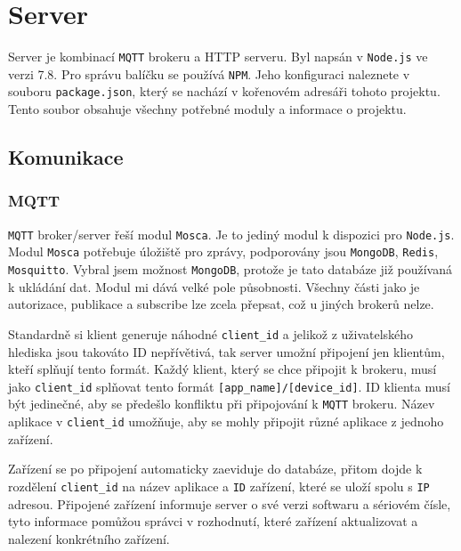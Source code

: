 \documentclass[czech,BP]{thesiskiv}
\begin{document}
	
	
	
\chapter{Server}
	
	Server je kombinací \texttt{MQTT} brokeru a HTTP serveru.
    Byl napsán v \texttt{Node.js} ve verzi 7.8.
  Pro správu balíčku se používá \texttt{NPM}. Jeho konfiguraci naleznete v souboru \texttt{package.json}, který se nachází v kořenovém adresáři tohoto projektu. Tento soubor obsahuje všechny potřebné moduly a informace o projektu.
	

	\section{Komunikace}
		\subsection{MQTT}
			\texttt{MQTT} broker/server řeší modul \texttt{Mosca}. Je to jediný modul k dispozici pro \texttt{Node.js}. Modul \texttt{Mosca} potřebuje úložiště pro zprávy, podporovány jsou \texttt{MongoDB}, \texttt{Redis}, \texttt{Mosquitto}. Vybral jsem možnost \texttt{MongoDB}, protože je tato databáze již používaná k ukládání dat. Modul mi dává velké pole působnosti. Všechny části jako je autorizace, publikace a subscribe lze zcela přepsat, což u jiných brokerů nelze.
			
			Standardně si klient generuje náhodné \texttt{client\_id} a jelikož z uživatelského hlediska jsou takováto ID nepřívětivá, tak server umožní připojení jen klientům, kteří splňují tento formát. Každý klient, který se chce připojit k brokeru, musí jako \texttt{client\_id} splňovat tento formát \texttt{[app\_name]/[device\_id]}. ID klienta musí být jedinečné, aby se předešlo konfliktu při připojování k \texttt{MQTT} brokeru. 
				Název aplikace v \texttt{client\_id} umožňuje, aby se mohly připojit různé aplikace z jednoho zařízení. 

			Zařízení se po připojení automaticky zaeviduje do databáze, přitom dojde k rozdělení \texttt{client\_id} na název aplikace a \texttt{ID} zařízení, které se uloží spolu s \texttt{IP} adresou. 
			Připojené zařízení informuje server o své verzi softwaru a sériovém čísle, tyto informace pomůžou správci v rozhodnutí, které zařízení aktualizovat a nalezení konkrétního zařízení. 
			
\end{document}
